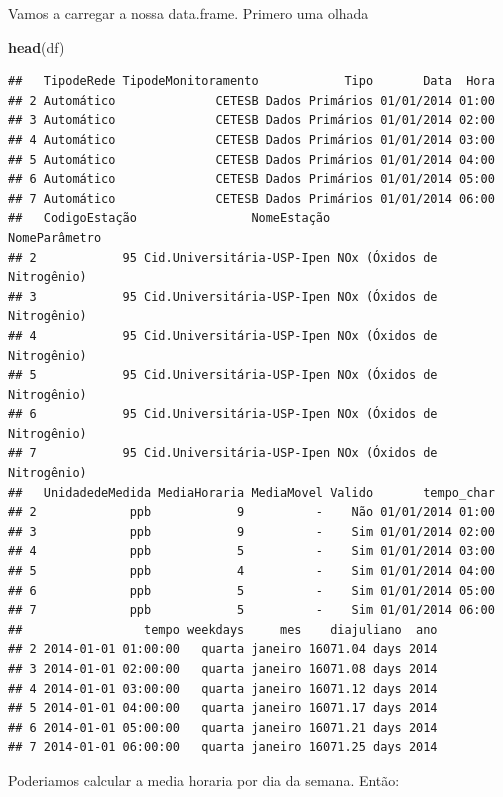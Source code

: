 \documentclass[]{book}
\newenvironment{Shaded}{\begin{snugshade}}{\end{snugshade}}
\newcommand{\KeywordTok}[1]{\textcolor[rgb]{0.13,0.29,0.53}{\textbf{#1}}}
\newcommand{\DataTypeTok}[1]{\textcolor[rgb]{0.13,0.29,0.53}{#1}}
\newcommand{\StringTok}[1]{\textcolor[rgb]{0.31,0.60,0.02}{#1}}
\newcommand{\OperatorTok}[1]{\textcolor[rgb]{0.81,0.36,0.00}{\textbf{#1}}}
\newcommand{\NormalTok}[1]{#1}
\theoremstyle{definition}
\theoremstyle{definition}
\theoremstyle{definition}
\theoremstyle{remark}
\begin{document}
Vamos a carregar a nossa data.frame. Primero uma olhada

\begin{Shaded}
\begin{Highlighting}[]
\KeywordTok{head}\NormalTok{(df)}
\end{Highlighting}
\end{Shaded}

\begin{verbatim}
##   TipodeRede TipodeMonitoramento            Tipo       Data  Hora
## 2 Automático              CETESB Dados Primários 01/01/2014 01:00
## 3 Automático              CETESB Dados Primários 01/01/2014 02:00
## 4 Automático              CETESB Dados Primários 01/01/2014 03:00
## 5 Automático              CETESB Dados Primários 01/01/2014 04:00
## 6 Automático              CETESB Dados Primários 01/01/2014 05:00
## 7 Automático              CETESB Dados Primários 01/01/2014 06:00
##   CodigoEstação                NomeEstação              NomeParâmetro
## 2            95 Cid.Universitária-USP-Ipen NOx (Óxidos de Nitrogênio)
## 3            95 Cid.Universitária-USP-Ipen NOx (Óxidos de Nitrogênio)
## 4            95 Cid.Universitária-USP-Ipen NOx (Óxidos de Nitrogênio)
## 5            95 Cid.Universitária-USP-Ipen NOx (Óxidos de Nitrogênio)
## 6            95 Cid.Universitária-USP-Ipen NOx (Óxidos de Nitrogênio)
## 7            95 Cid.Universitária-USP-Ipen NOx (Óxidos de Nitrogênio)
##   UnidadedeMedida MediaHoraria MediaMovel Valido       tempo_char
## 2             ppb            9          -    Não 01/01/2014 01:00
## 3             ppb            9          -    Sim 01/01/2014 02:00
## 4             ppb            5          -    Sim 01/01/2014 03:00
## 5             ppb            4          -    Sim 01/01/2014 04:00
## 6             ppb            5          -    Sim 01/01/2014 05:00
## 7             ppb            5          -    Sim 01/01/2014 06:00
##                 tempo weekdays     mes    diajuliano  ano
## 2 2014-01-01 01:00:00   quarta janeiro 16071.04 days 2014
## 3 2014-01-01 02:00:00   quarta janeiro 16071.08 days 2014
## 4 2014-01-01 03:00:00   quarta janeiro 16071.12 days 2014
## 5 2014-01-01 04:00:00   quarta janeiro 16071.17 days 2014
## 6 2014-01-01 05:00:00   quarta janeiro 16071.21 days 2014
## 7 2014-01-01 06:00:00   quarta janeiro 16071.25 days 2014
\end{verbatim}

Poderiamos calcular a media horaria por dia da semana. Então:

\begin{Shaded}
\end{Shaded}
\end{document}
